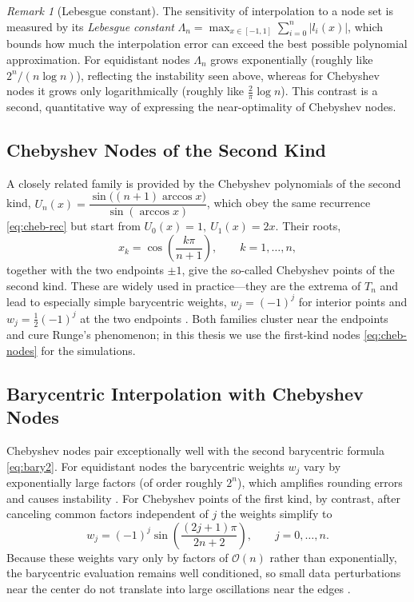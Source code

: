 \documentclass[12pt, a4paper]{article}
\theoremstyle{plain}
\theoremstyle{definition}
\theoremstyle{remark}
\newtheorem{remark}[theorem]{Remark}
\begin{document}
\begin{remark}[Lebesgue constant]
The sensitivity of interpolation to a node set is measured by its \emph{Lebesgue constant} $\Lambda_n = \max_{x\in[-1,1]} \sum_{i=0}^n |l_i(x)|$, which bounds how much the interpolation error can exceed the best possible polynomial approximation. For equidistant nodes $\Lambda_n$ grows exponentially (roughly like $2^{n}/(n\log n)$), reflecting the instability seen above, whereas for Chebyshev nodes it grows only logarithmically (roughly like $\tfrac{2}{\pi}\log n$). This contrast is a second, quantitative way of expressing the near-optimality of Chebyshev nodes.
\end{remark}

\subsection{Chebyshev Nodes of the Second Kind}

A closely related family is provided by the Chebyshev polynomials of the second kind, $U_n(x) = \dfrac{\sin\bigl((n+1)\arccos x\bigr)}{\sin(\arccos x)}$, which obey the same recurrence \eqref{eq:cheb-rec} but start from $U_0(x) = 1,\ U_1(x) = 2x$. Their roots,
\begin{equation}
    x_k = \cos\!\left(\frac{k\pi}{n+1}\right), \qquad k = 1, \dots, n,
\end{equation}
together with the two endpoints $\pm 1$, give the so-called Chebyshev points of the second kind. These are widely used in practice---they are the extrema of $T_n$ and lead to especially simple barycentric weights, $w_j = (-1)^j$ for interior points and $w_j = \tfrac{1}{2}(-1)^j$ at the two endpoints \cite{micula4}. Both families cluster near the endpoints and cure Runge's phenomenon; in this thesis we use the first-kind nodes \eqref{eq:cheb-nodes} for the simulations.

\subsection{Barycentric Interpolation with Chebyshev Nodes}

Chebyshev nodes pair exceptionally well with the second barycentric formula \eqref{eq:bary2}. For equidistant nodes the barycentric weights $w_j$ vary by exponentially large factors (of order roughly $2^n$), which amplifies rounding errors and causes instability \cite{micula4}. For Chebyshev points of the first kind, by contrast, after canceling common factors independent of $j$ the weights simplify to \cite{micula4}
\begin{equation}\label{eq:cheb-weights}
    w_j = (-1)^j \sin\!\left(\frac{(2j+1)\pi}{2n+2}\right), \qquad j = 0, \dots, n .
\end{equation}
Because these weights vary only by factors of $\mathcal{O}(n)$ rather than exponentially, the barycentric evaluation remains well conditioned, so small data perturbations near the center do not translate into large oscillations near the edges \cite{micula4, berrut}.
\end{document}
